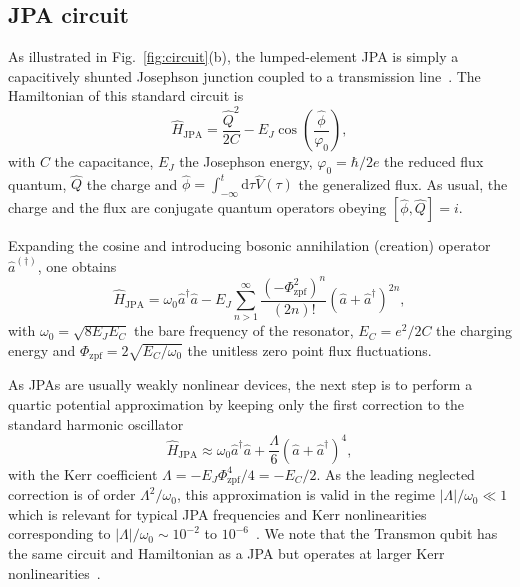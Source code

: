 \documentclass[pra,twocolumn,superscriptaddress]{revtex4-1}
\newcommand{\ah}[0]{\hat{a}}
\newcommand{\ffpz}[0]{\Phi_{\mathrm{zpf}}}
\newcommand{\parO}[1]{\left(#1\right)}
\newcommand{\abs}[1]{\left|#1\right|}
\newcommand{\drm}[0]{\mathrm{d}}
\begin{document}
\subsection{JPA circuit}\label{subsec::LJPAcircuit}
% 
As illustrated in Fig.~\ref{fig:circuit}(b), the lumped-element JPA is simply a capacitively shunted Josephson junction coupled to a transmission line~\cite{Yurke:1988kb,Hatridge:2011qf}.
The Hamiltonian of this standard circuit is
\begin{equation}
	\hat{H}_{\mathrm{JPA}} =  \frac{\hat{Q}^2}{2C} - E_J \cos \parO{ \frac{\hat{\phi}}{\varphi_0}},
\end{equation}
with $C$ the capacitance, $E_J$ the Josephson energy, $\varphi_0=\hbar/2e$ the reduced flux quantum, $\hat{Q}$ the charge and $\hat\phi = \int_{-\infty}^{t}\drm \tau \hat V(\tau)$ the generalized flux. As usual, the charge and the flux are conjugate quantum operators obeying
$[ \hat\phi \mathrm{,} \hat Q ] = i $. 

Expanding the cosine and introducing bosonic annihilation  
(creation) operator $\ah^{(\dag)}$, one obtains~\cite{Bourassa:2012fk}
\begin{equation}
	\hat{H}_{\mathrm{JPA}} = \omega_0 \ah^\dag \ah- E_J \sum_{n>1}^{\infty} \frac{\parO{-\ffpz^2}^n}{(2n)!} \parO{\ah+\ah^\dag}^{2n},
	\label{eq:HJPA_sum}
\end{equation}
with $\omega_0 = \sqrt{8 E_J E_C}$ the bare frequency of the resonator, $E_C = e^2/2C$ the charging energy and $\ffpz = 2 \sqrt{E_C/ \omega_0}$ the unitless zero point flux fluctuations.

As JPAs are usually weakly nonlinear devices, the next step is to perform a quartic potential approximation
 by keeping only the first correction to the standard harmonic oscillator
\begin{equation}
	\hat{H}_{\mathrm{JPA}} \approx 
	 \omega_0 \ah^\dag \ah
	 +   \frac{ \Lambda}{6} 	\parO{\ah+\ah^\dag }^{4}, \label{eq:hKerr_beforeRWA}
\end{equation}
with the Kerr coefficient $\Lambda = - E_J \ffpz^4 /4 = -E_C/2$. 
As the leading neglected correction is of order $ \Lambda^2/\omega_0$, this approximation is valid in the regime $\abs{\Lambda}/\omega_0 \ll 1$ which is relevant for typical JPA frequencies and Kerr nonlinearities corresponding to $\abs{\Lambda}/\omega_0 \sim 10^{-2}$ to $10^{-6}$~\cite{Bourassa:2012fk}.
We note that the Transmon qubit has the same circuit and Hamiltonian as a JPA but operates at larger Kerr nonlinearities~\cite{Koch:2007pb}.
\end{document}
